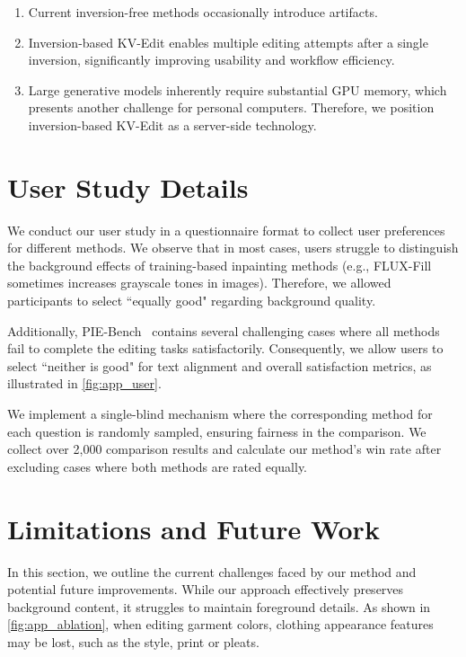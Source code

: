 \begin{enumerate}
    \item Current inversion-free methods occasionally introduce artifacts.
    \item Inversion-based KV-Edit enables multiple editing attempts after a single inversion, significantly improving usability and workflow efficiency.
    \item Large generative models inherently require substantial GPU memory, which presents another challenge for personal computers. Therefore, we position inversion-based KV-Edit as a server-side technology.
\end{enumerate}


\section{User Study Details}
\label{app:C}

We conduct our user study in a questionnaire format to collect user preferences for different methods. We observe that in most cases, users struggle to distinguish the background effects of training-based inpainting methods (e.g., FLUX-Fill~\cite{flux} sometimes increases grayscale tones in images). Therefore, we allowed participants to select ``equally good" regarding background quality.

Additionally, PIE-Bench~\cite{ju2024pnp} contains several challenging cases where all methods fail to complete the editing tasks satisfactorily. Consequently, we allow users to select ``neither is good" for text alignment and overall satisfaction metrics, as illustrated in \cref{fig:app_user}.

We implement a single-blind mechanism where the corresponding method for each question is randomly sampled, ensuring fairness in the comparison. We collect over 2,000 comparison results and calculate our method's win rate after excluding cases where both methods are rated equally.


\section{Limitations and Future Work}
\label{app:D}

In this section, we outline the current challenges faced by our method and potential future improvements. While our approach effectively preserves background content, it struggles to maintain foreground details. As shown in \cref{fig:app_ablation}, when editing garment colors, clothing appearance features may be lost, such as the style, print or pleats. 

